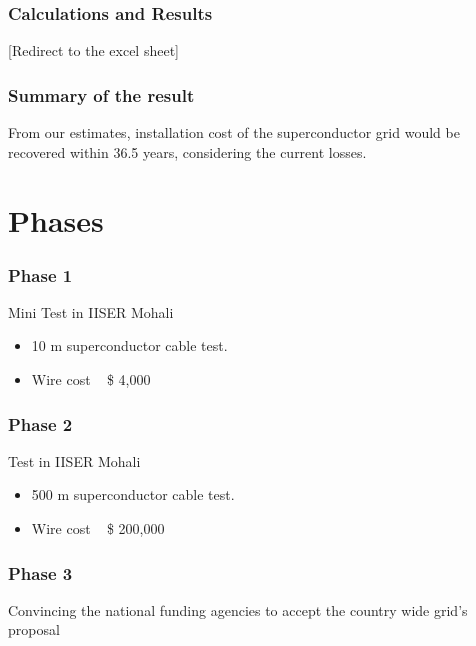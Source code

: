 \documentclass{beamer}
\begin{document}
		\begin{frame}	
			\frametitle{Calculations and Results}
				[Redirect to the excel sheet]
		\end{frame}

		\begin{frame}
			\frametitle{Summary of the result}
				From our estimates, installation cost of the superconductor grid would be recovered within 36.5 years, considering the current losses.
		\end{frame}

\section{Phases}
		\begin{frame}	
			\frametitle{Phase 1}
				Mini Test in IISER Mohali
				\begin{itemize}
					\item 10 m superconductor cable test.
					\item Wire cost ~ \$ 4,000
				\end{itemize}
		\end{frame}

		\begin{frame}	
			\frametitle{Phase 2}
				Test in IISER Mohali
				\begin{itemize}
					\item 500 m superconductor cable test.
					\item Wire cost ~ \$ 200,000
				\end{itemize}
		\end{frame}

		\begin{frame}
			\frametitle{Phase 3}
				Convincing the national funding agencies to accept the country wide grid's proposal
		\end{frame}


\end{document}
